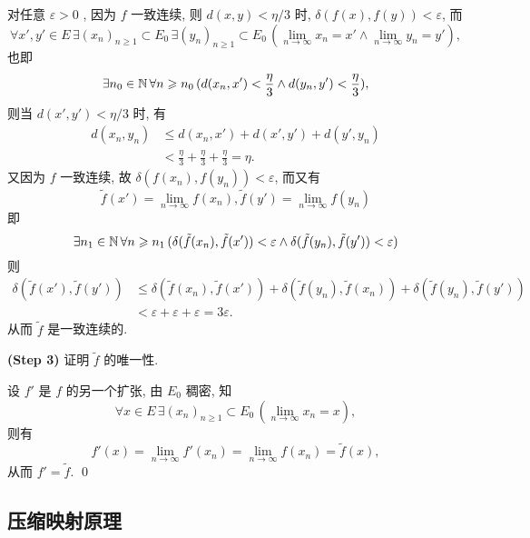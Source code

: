 \begin{Proof}
          对任意 $ \varepsilon>0 $ , 因为 $ f $ 一致连续, 则 $ d(x, y)<\eta/3 $ 时, $ \delta(f(x), f(y))<\varepsilon $, 而 
          \[
               \forall x', y'\in E\,\exists  (x_{n})_{n\geqslant1}\subset E_{0} \,\exists  (y_{n})_{n\geqslant1}\subset E_{0} \,(\lim_{n\to\infty}x_{n}=x'\land \lim_{n\to\infty}y_{n}=y' ), 
          \]  
          也即 
          \[
               \exists n_{0}\in\mathbb{N}\,\forall n\geqslant n_{0}\,(d(x_{n}, x')<\frac{\eta}{3}\land d(y_{n}, y')<\frac{\eta}{3}), 
          \] 
          则当 $ d(x', y')<\eta/3 $ 时, 有
          \[
               \begin{aligned}
                    d(x_{n}, y_{n}) & \leqslant d(x_{n}, x')+d(x', y')+d(y', y_{n})\\
                    & < \frac{\eta}{3}+\frac{\eta}{3}+\frac{\eta}{3}=\eta.
               \end{aligned}
          \]
          又因为 $ f $ 一致连续, 故 $ \delta(f(x_{n}), f(y_{n}))<\varepsilon $, 而又有
          \[
               \tilde{f}(x')=\lim_{n\to\infty}f(x_{n}), \tilde{f}(y')=\lim_{n\to\infty}f(y_{n})
          \]
          即
          \[
               \exists n_{1}\in\mathbb{N}\,\forall n\geqslant n_{1}\,(\delta(\tilde{f}(x_{n}), \tilde{f}(x'))<\varepsilon\land \delta(\tilde{f}(y_{n}), \tilde{f}(y'))<\varepsilon)
          \]
          则
          \[
               \begin{aligned}
                    \delta(\tilde{f}(x'), \tilde{f}(y')) & \leqslant \delta(\tilde{f}(x_{n}), \tilde{f}(x'))+\delta(\tilde{f}(y_{n}), \tilde{f}(x_{n}))+\delta(\tilde{f}(y_{n}), \tilde{f}(y'))\\
                    & <\varepsilon+\varepsilon+\varepsilon=3\varepsilon. 
               \end{aligned}
          \]
          从而 $ \tilde{f} $ 是一致连续的. 

          \textbf{(Step 3)} 证明 $ \tilde{f} $ 的唯一性. 

          
          设 $ {f}' $ 是 $ f $ 的另一个扩张, 由 $ E_{0} $ 稠密, 知
          \[
               \forall x\in E\,\exists (x_{n})_{n\geqslant1} \subset E_{0}\,(\lim_{n\to\infty}x_{n}=x),
          \]
          则有
          \[
               f'(x)=\lim_{n\to\infty}f'(x_{n})=\lim_{n\to\infty}f(x_{n})=\tilde{f}(x), 
          \]
          从而 $ f'=\tilde{f} $. \qed
     \end{Proof}

     \subsection{压缩映射原理}

